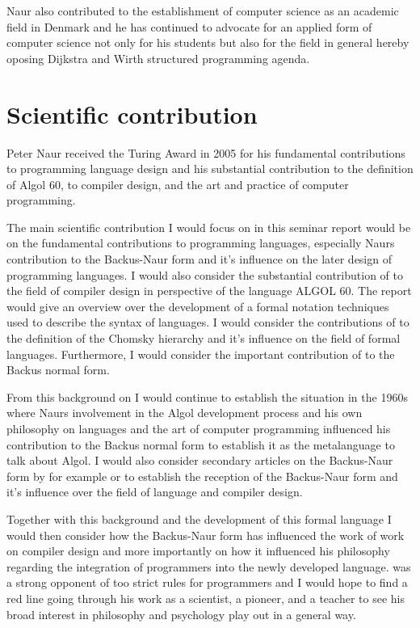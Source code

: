 \documentclass{article}
\begin{document}
Naur also contributed to the establishment of computer science as an academic field in Denmark and he has continued to advocate for an applied form of computer science not only for his students but also for the field in general hereby oposing Dijkstra and Wirth structured programming agenda.

\section{Scientific contribution}

Peter Naur received the Turing Award in 2005 for his fundamental contributions to programming language design and his substantial contribution to the definition of Algol 60, to compiler design, and the art and practice of computer programming. 

The main scientific contribution I would focus on in this seminar report would be on the fundamental contributions to programming languages, especially Naurs contribution to the Backus-Naur form and it's influence on the later design of programming languages. I would also consider the substantial contribution of \cite{Naur1963TheDO} to the field of compiler design in perspective of the language ALGOL 60. The report would give an overview over the development of a formal notation techniques used to describe the syntax of languages. I would consider the contributions of \cite{1056813} to the definition of the Chomsky hierarchy and it's influence on the field of formal languages. Furthermore, I would consider the important contribution of \cite{Backus1959TheSA} to the Backus normal form. 

From this background on I would continue to establish the situation in the 1960s where Naurs involvement in the Algol development process and his own philosophy on languages and the art of computer programming influenced his contribution to the Backus normal form to establish it as the metalanguage to talk about Algol. I would also consider secondary articles on the Backus-Naur form by for example \cite{10.5555/1074100.1074155} or \cite{rohl1968note} to establish the reception of the Backus-Naur form and it's influence over the field of language and compiler design.

Together with this background and the development of this formal language I would then consider how the Backus-Naur form has influenced the work of \cite{Naur1963TheDO} work on compiler design and more importantly on how it influenced his philosophy regarding the integration of programmers into the newly developed language. \cite{10.5555/1064048.1064049} was a strong opponent of too strict rules for programmers and I would hope to find a red line going through his work as a scientist, a pioneer, and a teacher to see his broad interest in philosophy and psychology play out in a general way. 
\end{document}
